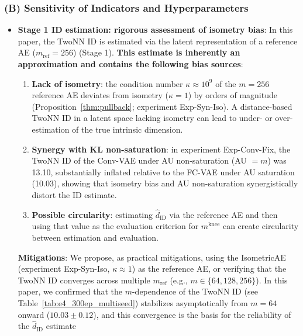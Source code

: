 \documentclass[make,article,submit,pdftex,moreauthors]{Definitions/mdpi}
\newcommand{\kap}{\kappa}
\newcommand{\mknee}{m^{\mathrm{knee}}}
\begin{document}
\subsubsection*{(B) Sensitivity of Indicators and Hyperparameters}

\begin{itemize}
  \item \textbf{Stage 1 ID estimation: rigorous assessment of isometry bias}:
        In this paper, the TwoNN ID is estimated via the latent representation of a
        reference AE ($m_\mathrm{ref}=256$) (Stage 1).
        \textbf{This estimate is inherently an approximation and contains the following
        bias sources}:
        \begin{enumerate}[label=(\roman*)]
          \item \textbf{Lack of isometry}: the condition number $\kap \approx 10^9$ of
                the $m=256$ reference AE deviates from isometry ($\kap=1$) by orders of
                magnitude (Proposition~\ref{thm:pullback}; experiment Exp-Syn-Iso).
                A distance-based TwoNN ID in a latent space lacking isometry can lead
                to under- or over-estimation of the true intrinsic dimension.
          \item \textbf{Synergy with KL non-saturation}: in experiment Exp-Conv-Fix, the
                TwoNN ID of the Conv-VAE under AU non-saturation (AU $=m$) was 13.10,
                substantially inflated relative to the FC-VAE under AU saturation
                (10.03), showing that isometry bias and AU non-saturation synergistically
                distort the ID estimate.
          \item \textbf{Possible circularity}: estimating $\hat{d}_\mathrm{ID}$ via the
                reference AE and then using that value as the evaluation criterion for
                $\mknee$ can create circularity between estimation and evaluation.
        \end{enumerate}
        \textbf{Mitigations}: We propose, as practical mitigations, using the
        IsometricAE (experiment Exp-Syn-Iso, $\kap \approx 1$) as the reference AE, or
        verifying that the TwoNN ID converges across multiple $m_\mathrm{ref}$
        (e.g., $m \in \{64, 128, 256\}$).
        In this paper, we confirmed that the $m$-dependence of the TwoNN ID (see
        Table~\ref{tab:e4_300ep_multiseed}) stabilizes asymptotically from $m=64$
        onward ($10.03 \pm 0.12$), and this convergence is the basis for the
        reliability of the $\hat{d}_\mathrm{ID}$ estimate

\end{itemize}
\end{document}
